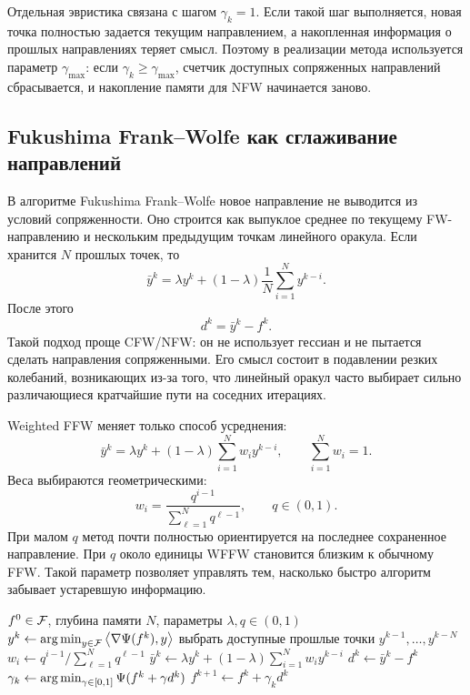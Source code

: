 Отдельная эвристика связана с шагом $\gamma_k=1$.
Если такой шаг выполняется, новая точка полностью задается текущим направлением, а накопленная
информация о прошлых направлениях теряет смысл.
Поэтому в реализации метода используется параметр $\gamma_{\max}$:
если $\gamma_k\geq\gamma_{\max}$, счетчик доступных сопряженных направлений сбрасывается,
и накопление памяти для NFW начинается заново.

\subsection{Fukushima Frank--Wolfe как сглаживание направлений}

В алгоритме Fukushima Frank--Wolfe новое направление не выводится из условий сопряженности.
Оно строится как выпуклое среднее по текущему FW-направлению и нескольким предыдущим точкам
линейного оракула.
Если хранится $N$ прошлых точек, то
\[
    \bar y^k
    =
    \lambda y^k
    +
    (1-\lambda)
    \frac{1}{N}\sum_{i=1}^{N}y^{k-i}.
\]
После этого
\[
    d^k=\bar y^k-f^k.
\]
Такой подход проще CFW/NFW: он не использует гессиан и не пытается сделать направления
сопряженными.
Его смысл состоит в подавлении резких колебаний, возникающих из-за того, что линейный оракул
часто выбирает сильно различающиеся кратчайшие пути на соседних итерациях.

Weighted FFW меняет только способ усреднения:
\[
    \bar y^k
    =
    \lambda y^k
    +
    (1-\lambda)
    \sum_{i=1}^{N}w_i y^{k-i},
    \qquad
    \sum_{i=1}^{N}w_i=1.
\]
Веса выбираются геометрическими:
\[
    w_i=\frac{q^{i-1}}{\sum_{\ell=1}^{N}q^{\ell-1}},
    \qquad q\in(0,1).
\]
При малом $q$ метод почти полностью ориентируется на последнее сохраненное направление.
При $q$ около единицы WFFW становится близким к обычному FFW.
Такой параметр позволяет управлять тем, насколько быстро алгоритм забывает устаревшую информацию.

\begin{algorithm}
\caption{Weighted Fukushima Frank--Wolfe}
\begin{algorithmic}
\REQUIRE $f^0\in\mathcal{F}$, глубина памяти $N$, параметры $\lambda,q\in(0,1)$
\STATE $y^k\gets\operatorname*{arg\,min}_{y\in\mathcal{F}}\left\langle \nabla\Psi(f^k), y \right\rangle$
\STATE выбрать доступные прошлые точки $y^{k-1},\ldots,y^{k-N}$
\STATE $w_i\gets q^{i-1}/\sum_{\ell=1}^{N}q^{\ell-1}$
\STATE $\bar y^k\gets\lambda y^k+(1-\lambda)\sum_{i=1}^{N}w_i y^{k-i}$
\STATE $d^k\gets\bar y^k-f^k$
\STATE $\gamma_k\gets\operatorname*{arg\,min}_{\gamma\in[0,1]}\Psi(f^k+\gamma d^k)$
\STATE $f^{k+1}\gets f^k+\gamma_kd^k$
\ENDFOR
\end{algorithmic}
\end{algorithm}

